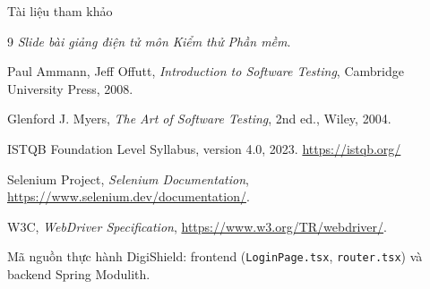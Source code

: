 \documentclass[aspectratio=169,12pt]{beamer}
\begin{document}
\begin{frame}{Tài liệu tham khảo}
  \vspace*{-0.4em}
  \footnotesize
  \begin{thebibliography}{9}
    \textit{Slide bài giảng điện tử môn Kiểm thử Phần mềm}.

    Paul Ammann, Jeff Offutt,
    \textit{Introduction to Software Testing}, Cambridge University Press, 2008.

    Glenford J. Myers,
    \textit{The Art of Software Testing}, 2nd ed., Wiley, 2004.

    ISTQB Foundation Level Syllabus, version 4.0, 2023.
    \url{https://istqb.org/}

    Selenium Project, \textit{Selenium Documentation},
    \url{https://www.selenium.dev/documentation/}.

    W3C, \textit{WebDriver Specification},
    \url{https://www.w3.org/TR/webdriver/}.

    Mã nguồn thực hành DigiShield: frontend
    (\texttt{LoginPage.tsx}, \texttt{router.tsx}) và backend Spring Modulith.
  \end{thebibliography}
\end{frame}

\end{document}
